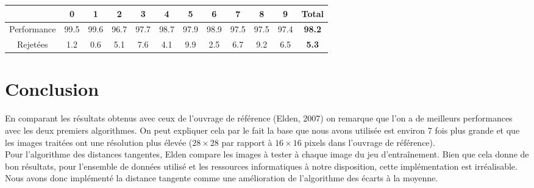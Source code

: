 \documentclass[a4paper,11pt,twoside]{report}
\begin{document}
\begin{center}
\begin{tabular}{ |c||c|c|c|c|c|c|c|c|c|c|c| } 
 \hline
   & 0 & 1 & 2 & 3 & 4 & 5 & 6 & 7 & 8 & 9 & \textbf{Total} \\ 
  \hline
  \hline
 Performance & 99.5 & 99.6 & 96.7 & 97.7 & 98.7 & 97.9 & 98.9 & 97.5 & 97.5 & 97.4 &  \textbf{98.2} \\
  \hline
 Rejetées & 1.2 & 0.6 & 5.1 & 7.6 & 4.1 & 9.9 & 2.5 & 6.7 & 9.2 & 6.5 & \textbf{5.3} \\
 \hline
\end{tabular}
\end{center}

\chapter{Conclusion}
En comparant les résultats obtenus avec ceux de l'ouvrage de référence (Elden, 2007) on remarque que l'on a de meilleurs performances avec les deux premiers algorithmes. On peut expliquer cela par le fait la base que nous avons utilisée est environ 7 fois plus grande et que les images traitées ont une résolution plus élevée ($28\times 28$ par rapport à $16\times 16$ pixels dans l'ouvrage de référence).\\
Pour l'algorithme des distances tangentes, Elden compare les images à tester à chaque image du jeu d'entraînement. Bien que cela donne de bon résultats, pour l'ensemble de données utilisé et les ressources informatiques à notre disposition, cette implémentation est irréalisable. Nous avons donc implémenté la distance tangente comme une amélioration de l'algorithme des écarts à la moyenne.


\nocite{*} 
\end{document}

